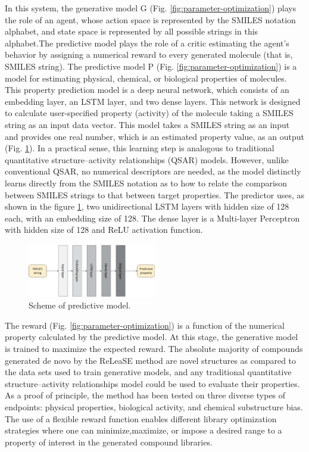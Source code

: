 \documentclass[conference]{IEEEtran}
\begin{document}
In this system, the generative model G (Fig. \ref{fig:parameter-optimization}) plays the role of an agent, whose action space is represented by the SMILES notation alphabet, and state space is represented by all possible strings in this alphabet.The predictive model plays the role of a critic estimating the agent’s behavior by assigning a numerical reward to every generated molecule (that is, SMILES string). 
The predictive model P (Fig. \ref{fig:parameter-optimization}) is a model for estimating physical, chemical, or biological properties of molecules. This property prediction model is a deep neural network, which consists of an embedding layer, an LSTM layer, and two dense layers. This network is designed to calculate user-specified property (activity) of the molecule taking a SMILES string as an input data vector. This model takes a SMILES string as an input and provides one real number, which is an estimated property value, as an output (Fig. \ref{fig:smiles-to-predicted-property}). In a practical sense, this learning step is analogous to traditional  quantitative structure–activity relationships (QSAR) models. However, unlike conventional QSAR, no numerical descriptors are needed, as the model distinctly learns directly from the SMILES notation as to how to relate the comparison between SMILES strings to that between target properties. The predictor uses, as shown in the figure \ref{fig:smiles-to-predicted-property}, two unidirectional LSTM layers with hidden size of 128 each, with an embedding size of 128. The dense layer is a Multi-layer Perceptron with hidden size of 128 and ReLU activation function.

\begin{figure}[htbp]
		\centering
			\includegraphics[width=0.50\textwidth]{smiles-to-predicted-property.png}
		\caption{Scheme of predictive model.}
		\label{fig:smiles-to-predicted-property}
	\end{figure}
	
The reward (Fig. \ref{fig:parameter-optimization}) is a function of the numerical property calculated by the predictive model. At this stage, the generative model is trained to maximize the expected reward.
The absolute majority of compounds generated de novo by the ReLeaSE method are novel structures as compared to the data sets used to train generative models, and any traditional quantitative structure–activity relationships model could be used to evaluate their properties.
As a proof of principle, the method has been tested on three diverse types of endpoints: physical properties, biological activity, and chemical substructure bias. The use of a flexible reward function enables different library optimization strategies where one can minimize,maximize, or impose a desired range to a property of interest in the generated compound libraries.
\end{document}
